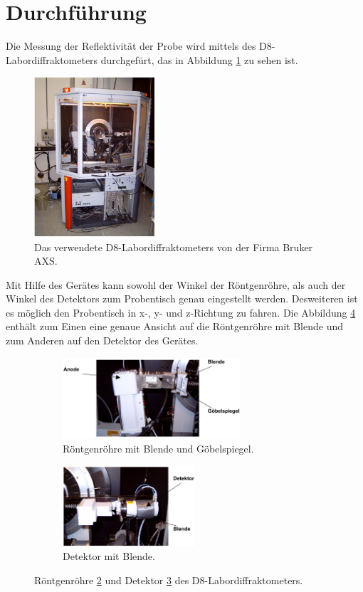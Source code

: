 \section{Durchführung}
\label{sec:Durchführung}
Die Messung der Reflektivität der Probe wird mittels
des D8-Labordiffraktometers
durchgefürt, das in Abbildung \ref{fig:app} zu sehen ist.
\begin{figure}
  \centering
  \includegraphics[width=0.4\textwidth]{bilder/apparatur.PNG}
  \caption{Das verwendete D8-Labordiffraktometers von der Firma Bruker AXS. \cite{sample}}
  \label{fig:app}
\end{figure}
Mit Hilfe des Gerätes kann sowohl der
Winkel der Röntgenröhre,
als auch der Winkel des Detektors zum Probentisch
genau eingestellt werden. Desweiteren ist es
möglich den Probentisch in x-, y- und z-Richtung zu fahren.
Die Abbildung \ref{fig:anode_det} enthält zum Einen eine genaue Ansicht auf die
Röntgenröhre mit Blende und zum Anderen auf den Detektor des Gerätes.

\begin{figure}
  \centering
  \begin{subfigure}{0.59\textwidth}
  \includegraphics[height=3cm]{bilder/anode.PNG}
  \caption{Röntgenröhre mit Blende und Göbelspiegel.}
  \label{fig:anode}
\end{subfigure}
\begin{subfigure}{0.39\textwidth}
\includegraphics[height=3cm]{bilder/detektor.PNG}
\caption{Detektor mit Blende.}
\label{fig:det}
\end{subfigure}
\caption{Röntgenröhre \ref{fig:anode} und Detektor \ref{fig:det} des D8-Labordiffraktometers. \cite{sample}}
\label{fig:anode_det}
\end{figure}

